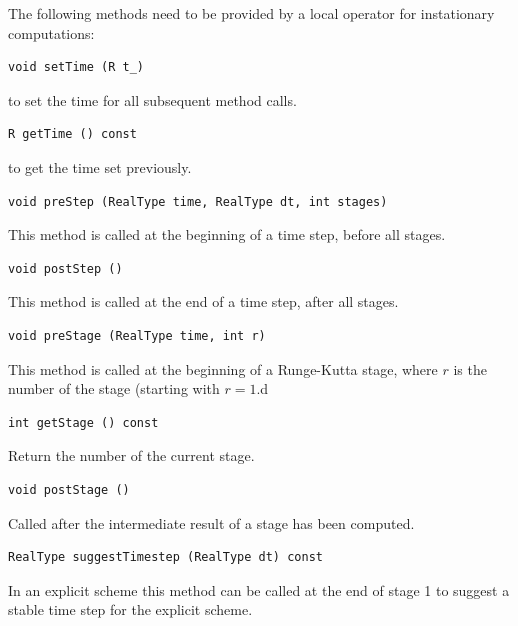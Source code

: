 \documentclass[a4paper,12pt]{article}
\begin{document}
The following methods need to be provided by a local
operator for instationary computations:
\begin{lstlisting}[basicstyle=\ttfamily,
frame=single,
backgroundcolor=\color{listingbg}]
void setTime (R t_)
\end{lstlisting}
to set the time for all subsequent method calls.

\begin{lstlisting}[basicstyle=\ttfamily,
frame=single,
backgroundcolor=\color{listingbg}]
R getTime () const
\end{lstlisting}
to get the time set previously.

\begin{lstlisting}[basicstyle=\ttfamily,
frame=single,
backgroundcolor=\color{listingbg}]
void preStep (RealType time, RealType dt, int stages)
\end{lstlisting}
This method is called at the beginning of a time step, before all stages.

\begin{lstlisting}[basicstyle=\ttfamily,
frame=single,
backgroundcolor=\color{listingbg}]
void postStep ()
\end{lstlisting}
This method is called at the end of a time step, after all stages.

\begin{lstlisting}[basicstyle=\ttfamily,
frame=single,
backgroundcolor=\color{listingbg}]
void preStage (RealType time, int r)
\end{lstlisting}
This method is called at the beginning of a Runge-Kutta stage, where
$r$ is the number of the stage (starting with $r=1$.d

\begin{lstlisting}[basicstyle=\ttfamily,
frame=single,
backgroundcolor=\color{listingbg}]
int getStage () const
\end{lstlisting}
Return the number of the current stage.

\begin{lstlisting}[basicstyle=\ttfamily,
frame=single,
backgroundcolor=\color{listingbg}]
void postStage ()
\end{lstlisting}
Called after the intermediate result of a stage has been computed.

\begin{lstlisting}[basicstyle=\ttfamily,
frame=single,
backgroundcolor=\color{listingbg}]
RealType suggestTimestep (RealType dt) const
\end{lstlisting}
In an explicit scheme this method can be called at the end of stage 1
to suggest a stable time step for the explicit scheme.
\end{document}
